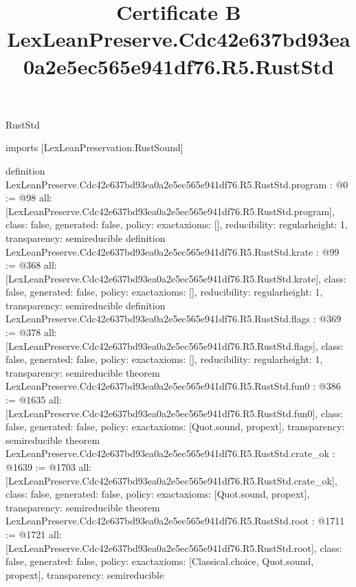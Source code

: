 \begin{lexlean}{RustStd}
\title{Certificate B LexLeanPreserve.Cdc42e637bd93ea0a2e5ec565e941df76.R5.RustStd}
\begin{coremodule}
imports [LexLeanPreservation.RustSound]

definition LexLeanPreserve.Cdc42e637bd93ea0a2e5ec565e941df76.R5.RustStd.program : @0 := @98 {
  all: [LexLeanPreserve.Cdc42e637bd93ea0a2e5ec565e941df76.R5.RustStd.program],
  class: false,
  generated: false,
  policy: exact{axioms: []},
  reducibility: regular{height: 1},
  transparency: semireducible
}
definition LexLeanPreserve.Cdc42e637bd93ea0a2e5ec565e941df76.R5.RustStd.krate : @99 := @368 {
  all: [LexLeanPreserve.Cdc42e637bd93ea0a2e5ec565e941df76.R5.RustStd.krate],
  class: false,
  generated: false,
  policy: exact{axioms: []},
  reducibility: regular{height: 1},
  transparency: semireducible
}
definition LexLeanPreserve.Cdc42e637bd93ea0a2e5ec565e941df76.R5.RustStd.flags : @369 := @378 {
  all: [LexLeanPreserve.Cdc42e637bd93ea0a2e5ec565e941df76.R5.RustStd.flags],
  class: false,
  generated: false,
  policy: exact{axioms: []},
  reducibility: regular{height: 1},
  transparency: semireducible
}
theorem LexLeanPreserve.Cdc42e637bd93ea0a2e5ec565e941df76.R5.RustStd.fun0 : @386 := @1635 {
  all: [LexLeanPreserve.Cdc42e637bd93ea0a2e5ec565e941df76.R5.RustStd.fun0],
  class: false,
  generated: false,
  policy: exact{axioms: [Quot.sound, propext]},
  transparency: semireducible
}
theorem LexLeanPreserve.Cdc42e637bd93ea0a2e5ec565e941df76.R5.RustStd.crate_ok : @1639 := @1703 {
  all: [LexLeanPreserve.Cdc42e637bd93ea0a2e5ec565e941df76.R5.RustStd.crate_ok],
  class: false,
  generated: false,
  policy: exact{axioms: [Quot.sound, propext]},
  transparency: semireducible
}
theorem LexLeanPreserve.Cdc42e637bd93ea0a2e5ec565e941df76.R5.RustStd.root : @1711 := @1721 {
  all: [LexLeanPreserve.Cdc42e637bd93ea0a2e5ec565e941df76.R5.RustStd.root],
  class: false,
  generated: false,
  policy: exact{axioms: [Classical.choice, Quot.sound, propext]},
  transparency: semireducible
}


\end{coremodule}
\end{lexlean}
